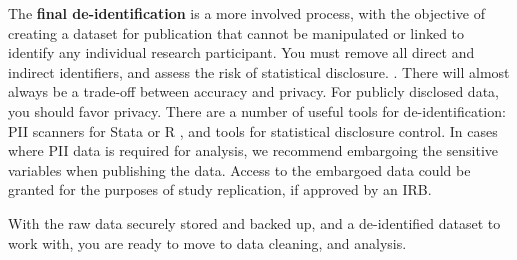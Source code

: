The \textbf{final de-identification} is a more involved process, with the objective of creating a dataset for publication that cannot be manipulated or linked to identify any individual research participant.
You must remove all direct and indirect identifiers, and assess the risk of statistical disclosure.
.
There will almost always be a trade-off between accuracy and privacy. For publicly disclosed data, you should favor privacy.
There are a number of useful tools for de-identification: PII scanners for Stata
 or R
,
and tools for statistical disclosure control.
In cases where PII data is required for analysis, we recommend embargoing the sensitive variables when publishing the data.
Access to the embargoed data could be granted for the purposes of study replication, if approved by an IRB.



With the raw data securely stored and backed up, and a de-identified dataset to work with, you are ready to move to data cleaning, and analysis.

